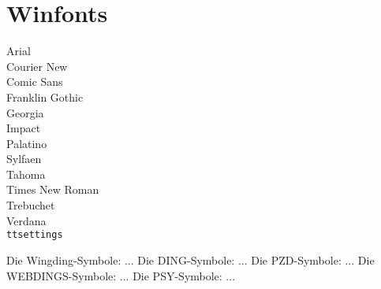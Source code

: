 \documentclass{article}
\begin{document}
\section{Winfonts}
\selectfont Arial \normalfont \\
\selectfont Courier New \normalfont \\
\selectfont Comic Sans \normalfont \\
\selectfont Franklin Gothic \normalfont \\
\selectfont Georgia \normalfont \\
\selectfont Impact \normalfont \\
\selectfont Palatino \normalfont \\
\selectfont Sylfaen \normalfont \\
\selectfont Tahoma \normalfont \\
\selectfont Times New Roman \normalfont \\
\selectfont Trebuchet \normalfont \\
\selectfont Verdana \normalfont \\

\renewcommand{\ttdefault}{courier-ttf} {\tt ttsettings}

Die Wingding-Symbole:  ... 
Die DING-Symbole:  ... 
Die PZD-Symbole:  ... 
Die WEBDINGS-Symbole:  ... 
Die PSY-Symbole:  ... 
\end{document}
